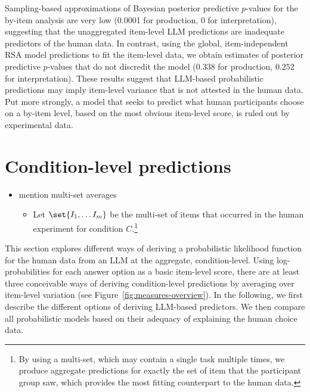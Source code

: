 \documentclass[fleqn]{article}
\begin{document}
Sampling-based approximations of Bayesian posterior predictive $p$-values for the by-item analysis are very low (0.0001 for production, 0 for interpretation), suggesting that the unaggregated item-level LLM predictions are inadequate predictors of the human data.
In contrast, using the global, item-independent RSA model predictions to fit the item-level data, we obtain estimates of posterior predictive $p$-values that do not discredit the model ($0.338$ for production, $0.252$ for interpretation).
These results suggest that LLM-based probabilistic predictions may imply item-level variance that is not attested in the human data.
Put more strongly, a model that seeks to predict what human participants choose on a by-item level, based on the most obvious item-level score, is ruled out by experimental data.



\section{Condition-level predictions}
\label{llm-predictions-for-reference-games}


\begin{itemize}
  \item mention multi-set averages
  \begin{itemize}
    \item Let \(\set{I_1, \dots I_m}\) be the multi-set of items that occurred in the human experiment for condition $C$.\footnote{
  By using a multi-set, which may contain a single task multiple times, we produce aggregate predictions for exactly the set of item that the participant group saw, which provides the most fitting counterpart to the human data.
}

  \end{itemize}
\end{itemize}


This section explores different ways of deriving a probabilistic likelihood function for the human data from an LLM at the aggregate, condition-level.
Using log-probabilities for each answer option as a basic item-level score, there are at least three conceivable ways of deriving condition-level predictions by averaging over item-level variation (see Figure~\ref{fig:measures-overview}).
In the following, we first describe the different options of deriving LLM-based predictors.
We then compare all probabilistic models based on their adequacy of explaining the human choice data.
\end{document}
